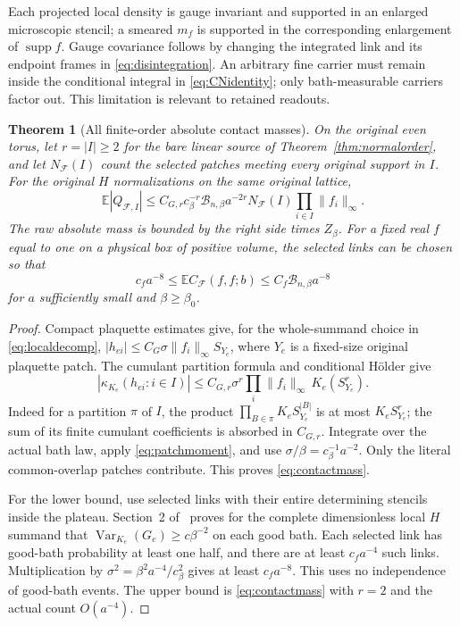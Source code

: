 \documentclass[11pt,letterpaper]{article}
\theoremstyle{plain}
\newtheorem{theorem}{Theorem}[section]
\theoremstyle{remark}\newtheorem{remark}[theorem]{Scope}
\DeclareMathOperator{\Var}{Var}\DeclareMathOperator{\Cov}{Cov}
\DeclareMathOperator{\supp}{supp}\DeclareMathOperator{\diver}{div}
\newcommand{\E}{\mathbb E}\newcommand{\R}{\mathbb R}
\begin{document}
Each projected local density is gauge invariant and supported in an enlarged
microscopic stencil; a smeared $m_f$ is supported in the corresponding enlargement
of $\supp f$. Gauge covariance follows by changing the integrated link and its
endpoint frames in \eqref{eq:disintegration}. An arbitrary fine carrier must remain
inside the conditional integral in \eqref{eq:CNidentity}; only bath-measurable
carriers factor out. This limitation is relevant to retained readouts.

\begin{theorem}[All finite-order absolute contact masses]
\label{thm:contactmass}
On the original even torus, let $r=|I|\ge2$ for the bare linear source of
Theorem~\ref{thm:normalorder}, and let $N_{\mathcal F}(I)$ count the selected patches meeting
every original support in $I$. For the original $H$ normalizations on the same
original lattice,
\begin{equation}
\E|Q_{\mathcal F,I}|
\le C_{G,r}c_\beta^{-r}\mathcal B_{n,\beta}a^{-2r}
N_{\mathcal F}(I)\prod_{i\in I}\|f_i\|_\infty.
\label{eq:contactmass}
\end{equation}
The raw absolute mass is bounded by the right side times $Z_\beta$.
For a fixed real $f$ equal to one on a physical box of positive volume, the selected
links can be chosen so that
\begin{equation}
c_fa^{-8}\le \E C_{\mathcal F}(f,f;b)
\le C_f\mathcal B_{n,\beta}a^{-8}
\label{eq:contacttwosided}
\end{equation}
for $a$ sufficiently small and $\beta\ge\beta_0$.
\end{theorem}
\begin{proof}
Compact plaquette estimates give, for the whole-summand choice in
\eqref{eq:localdecomp},
$|h_{ei}|\le C_G\sigma\|f_i\|_\infty S_{Y_e}$,
where $Y_e$ is a fixed-size original plaquette patch. The cumulant partition
formula and conditional H\"older give
\[
|\kappa_{K_e}(h_{ei}:i\in I)|
\le C_{G,r}\sigma^r\prod_i\|f_i\|_\infty\,K_e(S_{Y_e}^r).
\]
Indeed for a partition $\pi$ of $I$, the product
$\prod_{B\in\pi}K_eS_{Y_e}^{|B|}$ is at most $K_eS_{Y_e}^r$;
the sum of its finite cumulant coefficients is absorbed in $C_{G,r}$.
Integrate over the actual bath law, apply \eqref{eq:patchmoment}, and use
$\sigma/\beta=c_\beta^{-1}a^{-2}$. Only the literal common-overlap patches
contribute. This proves \eqref{eq:contactmass}.

For the lower bound, use selected links with their entire determining stencils
inside the plateau. Section~2 of~\cite{ND} proves for the complete dimensionless local
$H$ summand that $\Var_{K_e}(G_e)\ge c\beta^{-2}$ on each good bath. Each selected
link has good-bath probability at least one half, and there are at least
$c_fa^{-4}$ such links. Multiplication by
$\sigma^2=\beta^2a^{-4}/c_\beta^2$ gives at least $c_fa^{-8}$.
This uses no independence of good-bath events. The upper bound is
\eqref{eq:contactmass} with $r=2$ and the actual count $O(a^{-4})$.
\end{proof}
\end{document}
